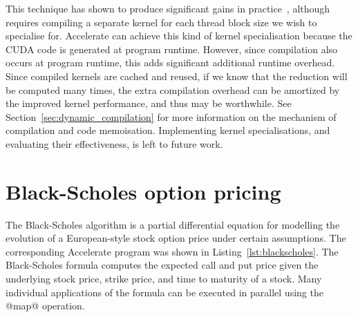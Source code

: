 This technique has shown to produce significant gains in
practice~\cite{Harris:2007te}, although requires compiling a separate kernel for
each thread block size we wish to specialise for. Accelerate can achieve this
kind of kernel specialisation because the CUDA code is generated at program
runtime. However, since compilation also occurs at program runtime, this adds
significant additional runtime overhead. Since compiled kernels are cached and
reused, if we know that the reduction will be computed many times, the extra
compilation overhead can be amortized by the improved kernel performance, and
thus may be worthwhile. See Section~\ref{sec:dynamic_compilation} for more
information on the mechanism of compilation and code memoisation. Implementing
kernel specialisations, and evaluating their effectiveness, is left to future
work.


\section{Black-Scholes option pricing}
\label{sec:blackscholes}

The Black-Scholes algorithm is a partial differential equation for modelling the
evolution of a European-style stock option price under certain assumptions. The
corresponding Accelerate program was shown in Listing~\ref{lst:blackscholes}.
The Black-Scholes formula computes the expected call and put price given the
underlying stock price, strike price, and time to maturity of a stock. Many
individual applications of the formula can be executed in parallel using the @map@
operation.

%
%

